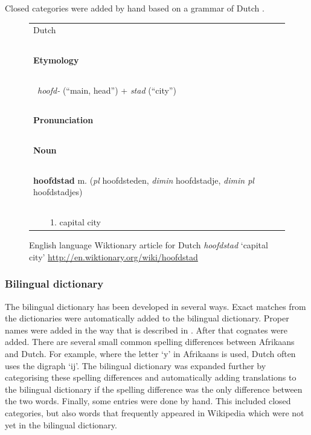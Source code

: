 \documentclass[11pt]{article}
\begin{document}
Closed categories were added by hand based on a grammar of Dutch \cite{Shetter:02}.

\begin{figure}
\centering
\begin{tiny}
\begin{tabular}{|l|}
\hline
{\large Dutch} \\
~\\
{\bf Etymology}\\
~\\
~{\em hoofd-} (``main, head'') + {\em stad} (``city'')\\
~\\
{\bf Pronunciation}\\
~\\
{\bf Noun}\\
~\\
{\bf hoofdstad} m. ({\em pl} hoofdsteden, {\em dimin} hoofdstadje, {\em dimin pl} hoofdstadjes) \\
~\\
~~~~1. capital city \\

\hline
\end{tabular}
\end{tiny}
\caption{English language Wiktionary article for Dutch \emph{hoofdstad} `capital city' 
    {\small \url{http://en.wiktionary.org/wiki/hoofdstad}}}
\label{fig:wikt1}
\end{figure}

\subsubsection{Bilingual dictionary}

The bilingual dictionary has been developed in several ways.
Exact matches from the dictionaries
were automatically added to the bilingual dictionary. Proper names were added in the
way that is described in . After that cognates were added. There are several
small common spelling differences between Afrikaans and Dutch. For example,
where the letter `y' in Afrikaans is used, Dutch often uses the digraph `ij'.
The bilingual dictionary was expanded further by categorising these spelling differences and
automatically adding translations to the bilingual dictionary if the spelling difference was the
only difference between the two words. Finally, some entries were done by hand.
This included closed categories, but also words that frequently appeared in Wikipedia
which were not yet in the bilingual dictionary.
\end{document}
